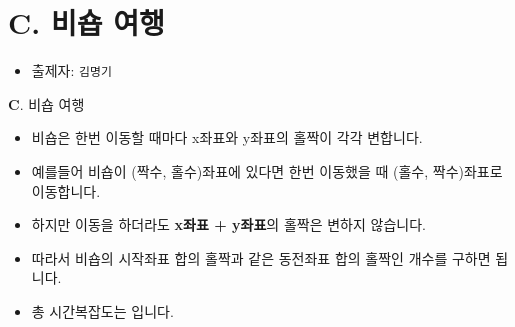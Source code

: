 \section{C. 비숍 여행}

\begin{frame} %
    \begin{itemize}
        \item 출제자: \texttt{김명기}
    \end{itemize}
\end{frame}

\begin{frame}{\textbf{C}. 비숍 여행}
    \begin{itemize}
    	\item 비숍은 한번 이동할 때마다 x좌표와 y좌표의 홀짝이 각각 변합니다.
    	\item 예를들어 비숍이 (짝수, 홀수)좌표에 있다면 한번 이동했을 때 (홀수, 짝수)좌표로 이동합니다.
    	\item 하지만 이동을 하더라도 \textbf{x좌표 + y좌표}의 홀짝은 변하지 않습니다.
    	\item 따라서 비숍의 시작좌표 합의 홀짝과 같은 동전좌표 합의 홀짝인 개수를 구하면 됩니다.
    	\item 총 시간복잡도는 입니다.
    \end{itemize}
\end{frame}